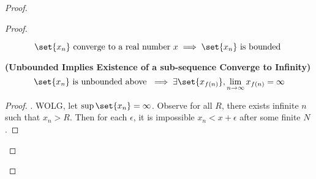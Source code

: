 \documentclass{report}
\begin{document}
\begin{proof}
\begin{proof}
\begin{theorem}
\begin{equation*}
\set{x_n}\text{ converge to a real number $x$}\implies \set{x_n}\text{ is bounded }
\end{equation*}
\end{theorem}
\begin{corollary}
\label{4.1.4}
\textbf{(Unbounded Implies Existence of a sub-sequence Converge to Infinity)}
\begin{equation*}
\set{x_n}\text{ is unbounded above }\implies \exists \set{x_{f(n)}}, \lim_{n\to\infty}x_{f(n)}=\infty
\end{equation*}
\end{corollary}
\begin{proof}
. WOLG, let $\sup \set{x_n}=\infty$. Observe for all $R$, there exists infinite $n$ such that  $x_n>R$. Then for each $\epsilon $, it is impossible $x_n<x+\epsilon $ after some finite $N$.  \CaC
\end{proof}
\end{proof}
\end{proof}
\end{document}
